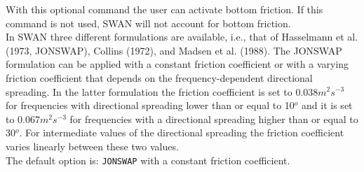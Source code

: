 \documentclass[12pt]{book}
\begin{document}
\noindent
With this optional command the user can activate bottom friction. If this command is not used, SWAN will not account for bottom friction.
\\[2ex]
\noindent
In SWAN three different formulations are available, i.e., that of Hasselmann et al. (1973, JONSWAP),
Collins (1972), and Madsen et al. (1988). The JONSWAP formulation can be applied with a constant friction
coefficient or with a varying friction coefficient that depends on the frequency-dependent directional
spreading. In the latter formulation the friction coefficient is set to 0.038$m^2 s^{-3}$ for frequencies
with directional spreading lower than or equal to 10$^o$ and it is set to 0.067$m^2 s^{-3}$ for frequencies
with a directional spreading higher than or equal to 30$^o$. For intermediate values of the directional
spreading the friction coefficient varies linearly between these two values.
\\[2ex]
\noindent
The default option is: {\tt JONSWAP} with a constant friction coefficient.
\end{document}
